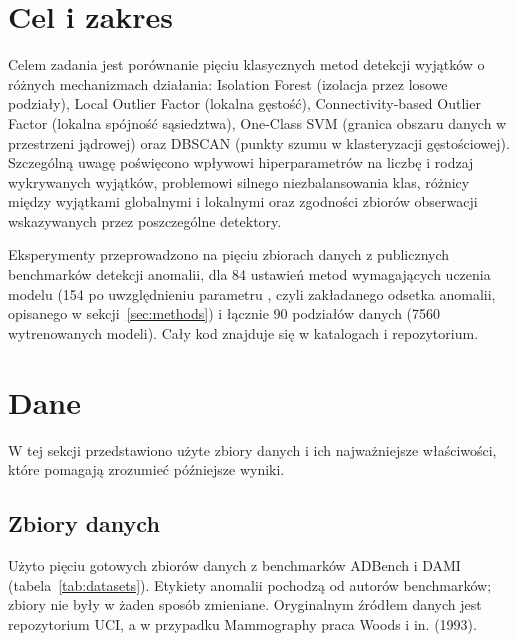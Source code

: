 \documentclass[11pt,a4paper]{article}
\begin{document}
\tableofcontents
\newpage

\section{Cel i zakres}

Celem zadania jest porównanie pięciu klasycznych metod detekcji wyjątków
o różnych mechanizmach działania: Isolation Forest (izolacja przez losowe
podziały), Local Outlier Factor (lokalna gęstość), Connectivity-based Outlier
Factor (lokalna spójność sąsiedztwa), One-Class SVM (granica obszaru danych
w przestrzeni jądrowej) oraz DBSCAN (punkty szumu w klasteryzacji gęstościowej).
Szczególną uwagę poświęcono wpływowi hiperparametrów na liczbę i rodzaj
wykrywanych wyjątków, problemowi silnego niezbalansowania klas, różnicy
między wyjątkami globalnymi i lokalnymi oraz zgodności zbiorów obserwacji
wskazywanych przez poszczególne detektory.

Eksperymenty przeprowadzono na pięciu zbiorach danych z publicznych
benchmarków detekcji anomalii, dla 84 ustawień metod wymagających uczenia
modelu (154 po uwzględnieniu parametru , czyli
zakładanego odsetka anomalii, opisanego w sekcji~\ref{sec:methods}) i łącznie
90 podziałów danych (7560 wytrenowanych modeli). Cały kod znajduje się
w katalogach  i  repozytorium.

\FloatBarrier
\section{Dane}

W tej sekcji przedstawiono użyte zbiory danych i ich najważniejsze
właściwości, które pomagają zrozumieć późniejsze wyniki.

\FloatBarrier
\subsection{Zbiory danych}

Użyto pięciu gotowych zbiorów danych z benchmarków ADBench
i DAMI (tabela~\ref{tab:datasets}). Etykiety anomalii pochodzą
od autorów benchmarków; zbiory nie były w żaden sposób zmieniane.
Oryginalnym źródłem danych jest repozytorium UCI,
a w przypadku Mammography praca Woods i in. (1993).

\begin{table}[H]
  \centering\small
  \caption{Zbiory danych użyte w zadaniu.}
  \label{tab:datasets}
\end{table}
\end{document}
